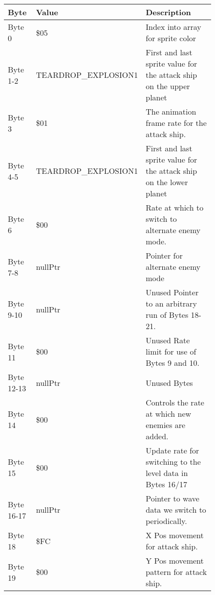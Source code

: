 \begin{figure}[H]
  {
  \setlength{\tabcolsep}{3.0pt}
  \setlength\cmidrulewidth{\heavyrulewidth} %
  \begin{adjustbox}{width=12cm}

\begin{tabular}{lll}
\toprule
 Byte       & Value                    & Description                                                         \\
\midrule
 Byte 0     & \$05                      & Index into array for sprite color                                   \\
 Byte 1-2   & TEARDROP\_EXPLOSION1      & First and last sprite value for the attack ship on the upper planet \\
 Byte 3     & \$01                      & The animation frame rate for the attack ship.                       \\
 Byte 4-5   & TEARDROP\_EXPLOSION1      & First and last sprite value for the attack ship on the lower planet \\
 Byte 6     & \$00                      & Rate at which to switch to alternate enemy mode.                    \\
 Byte 7-8   & nullPtr                  & Pointer for alternate enemy mode                                    \\
 Byte 9-10  & nullPtr                  & Unused Pointer to an arbitrary run of Bytes 18-21.                  \\
 Byte 11    & \$00                      & Unused Rate limit for use of Bytes 9 and 10.                        \\
 Byte 12-13 & nullPtr                  & Unused Bytes                                                        \\
 Byte 14    & \$00                      & Controls the rate at which new enemies are added.                   \\
 Byte 15    & \$00                      & Update rate for switching to the level data in Bytes 16/17          \\
 Byte 16-17 & nullPtr                  & Pointer to wave data we switch to periodically.                     \\
 Byte 18    & \$FC                      & X Pos movement for attack ship.                                     \\
 Byte 19    & \$00                      & Y Pos movement pattern for attack ship.                             \\

\end{tabular}
\end{adjustbox}}
\end{figure}
